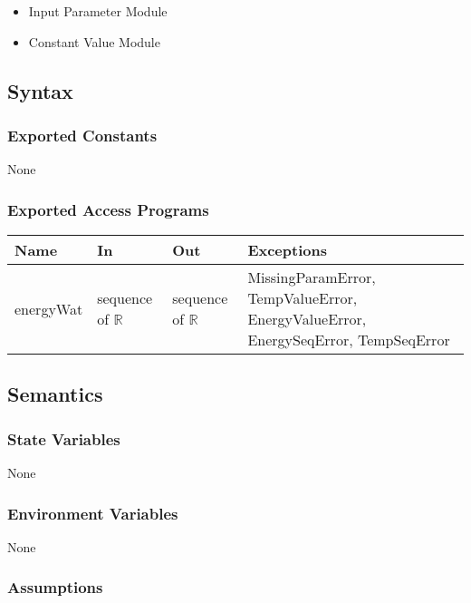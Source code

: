 \documentclass[12pt, titlepage]{article}
\begin{document}
\begin{itemize}
    \item Input Parameter Module
    \item Constant Value Module
\end{itemize}

\subsection{Syntax}

\subsubsection{Exported Constants}
None

\subsubsection{Exported Access Programs}

\begin{center}
\begin{tabular}{p{1.9cm} p{5cm} p{4cm} p{3.5cm}}
\hline
\textbf{Name} & \textbf{In} & \textbf{Out} & \textbf{Exceptions} \\
\hline
energyWat & sequence of $\mathbb{R}$ & sequence of $\mathbb{R}$ & MissingParamError, TempValueError, EnergyValueError, EnergySeqError, TempSeqError \\   
\hline
\end{tabular}
\end{center}

\subsection{Semantics}

\subsubsection{State Variables}

None

\subsubsection{Environment Variables}

None  

\subsubsection{Assumptions}
\end{document}
